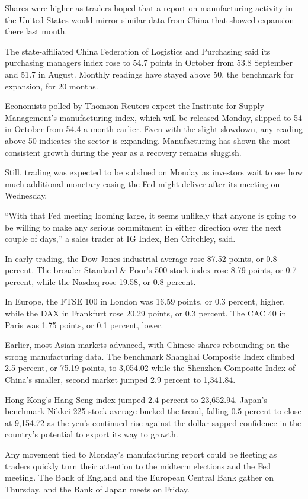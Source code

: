 ﻿\documentclass[12pt]{article}
\begin{document}
Shares were higher as traders hoped that a report on manufacturing activity in the United States
would mirror similar data from China that showed expansion there last month.

The state-affiliated China Federation of Logistics and Purchasing said its purchasing managers index
rose to 54.7 points in October from 53.8 September and 51.7 in August. Monthly readings have stayed
above 50, the benchmark for expansion, for 20 months.

Economists polled by Thomson Reuters expect the Institute for Supply Management's manufacturing
index, which will be released Monday, slipped to 54 in October from 54.4 a month earlier. Even with
the slight slowdown, any reading above 50 indicates the sector is expanding. Manufacturing has shown
the most consistent growth during the year as a recovery remains sluggish.

Still, trading was expected to be subdued on Monday as investors wait to see how much additional
monetary easing the Fed might deliver after its meeting on Wednesday.

``With that Fed meeting looming large, it seems unlikely that anyone is going to be willing to make
any serious commitment in either direction over the next couple of days,'' a sales trader at IG
Index, Ben Critchley, said.

In early trading, the Dow Jones industrial average rose 87.52 points, or 0.8 percent. The broader
Standard \& Poor's 500-stock index rose 8.79 points, or 0.7 percent, while the Nasdaq rose 19.58, or
0.8 percent.

In Europe, the FTSE 100 in London was 16.59 points, or 0.3 percent, higher, while the DAX in
Frankfurt rose 20.29 points, or 0.3 percent. The CAC 40 in Paris was 1.75 points, or 0.1 percent,
lower.

Earlier, most Asian markets advanced, with Chinese shares rebounding on the strong manufacturing
data. The benchmark Shanghai Composite Index climbed 2.5 percent, or 75.19 points, to 3,054.02 while
the Shenzhen Composite Index of China's smaller, second market jumped 2.9 percent to 1,341.84.

Hong Kong's Hang Seng index jumped 2.4 percent to 23,652.94. Japan's benchmark Nikkei 225 stock
average bucked the trend, falling 0.5 percent to close at 9,154.72 as the yen's continued rise
against the dollar sapped confidence in the country's potential to export its way to growth.

Any movement tied to Monday's manufacturing report could be fleeting as traders quickly turn their
attention to the midterm elections and the Fed meeting. The Bank of England and the European Central
Bank gather on Thursday, and the Bank of Japan meets on Friday.
\end{document}
